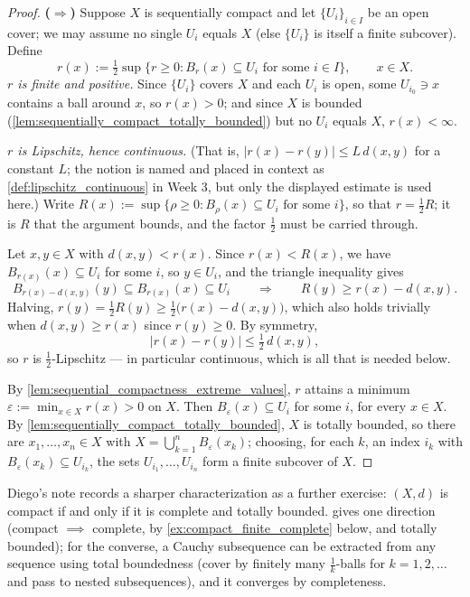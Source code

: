 \begin{proof}
\textbf{($\Rightarrow$)} Suppose $X$ is sequentially compact and let $\{U_i\}_{i\in I}$ be an open
cover; we may assume no single $U_i$ equals $X$ (else $\{U_i\}$ is itself a finite subcover).
Define
\[r(x) := \tfrac12\sup\{r \geq 0 : B_r(x) \subseteq U_i \text{ for some } i \in I\}, \qquad x \in X.\]
\textit{$r$ is finite and positive.} Since $\{U_i\}$ covers $X$ and each $U_i$ is open, some
$U_{i_0} \ni x$ contains a ball around $x$, so $r(x) > 0$; and since $X$ is bounded
(\cref{lem:sequentially_compact_totally_bounded}) but no $U_i$ equals $X$, $r(x) < \infty$.

\textit{$r$ is Lipschitz, hence continuous.} (That is, $|r(x)-r(y)| \leq L\,d(x,y)$ for a
constant $L$; the notion is named and placed in context as \cref{def:lipschitz_continuous} in
Week 3, but only the displayed estimate is used here.) Write
$R(x) := \sup\{\rho \geq 0 : B_\rho(x) \subseteq U_i \text{ for some } i\}$, so that
$r = \tfrac12 R$; it is $R$ that the argument bounds, and the factor $\tfrac12$ must be carried
through.

Let $x,y \in X$ with $d(x,y) < r(x)$. Since $r(x) < R(x)$, we have
$B_{r(x)}(x) \subseteq U_i$ for some $i$, so $y \in U_i$, and the triangle inequality gives
\[B_{r(x)-d(x,y)}(y) \subseteq B_{r(x)}(x) \subseteq U_i
\qquad\Longrightarrow\qquad R(y) \geq r(x)-d(x,y).\]
Halving, $r(y) = \tfrac12R(y) \geq \tfrac12\big(r(x)-d(x,y)\big)$, which also holds trivially
when $d(x,y) \geq r(x)$ since $r(y) \geq 0$. By symmetry,
\[|r(x)-r(y)| \leq \tfrac12\,d(x,y),\]
so $r$ is $\tfrac12$-Lipschitz --- in particular continuous, which is all that is needed below.

By \cref{lem:sequential_compactness_extreme_values}, $r$ attains a minimum
$\varepsilon := \min_{x\in X} r(x) > 0$ on $X$. Then $B_\varepsilon(x) \subseteq U_i$ for some $i$,
for every $x \in X$. By \cref{lem:sequentially_compact_totally_bounded}, $X$ is totally bounded,
so there are $x_1,\dots,x_n \in X$ with $X = \bigcup_{k=1}^n B_\varepsilon(x_k)$; choosing, for
each $k$, an index $i_k$ with $B_\varepsilon(x_k) \subseteq U_{i_k}$, the sets
$U_{i_1},\dots,U_{i_n}$ form a finite subcover of $X$.
\end{proof}

\begin{remark}
\label{rem:compact_iff_complete_totally_bounded}
Diego's note records a sharper characterization as a further exercise: $(X,d)$ is compact if and
only if it is complete and totally bounded.  gives
one direction (compact $\implies$ complete, by \cref{ex:compact_finite_complete} below, and
totally bounded); for the converse, a Cauchy subsequence can be extracted from any sequence using
total boundedness (cover by finitely many $\tfrac1k$-balls for $k=1,2,\dots$ and pass to nested
subsequences), and it converges by completeness.
\end{remark}

